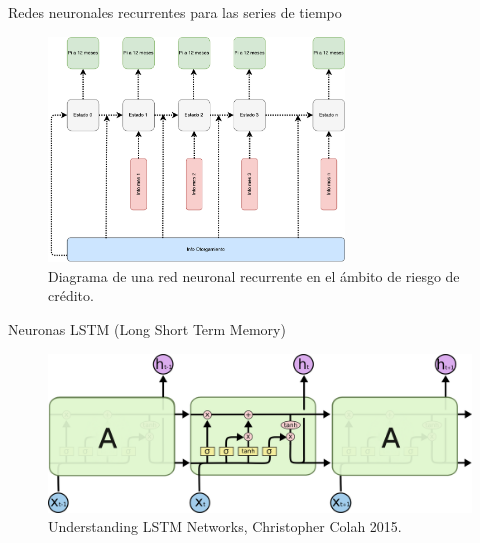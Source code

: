 \documentclass[11pt,usenames, dvipsnames]{beamer}
\begin{document}
\begin{frame}{Redes neuronales recurrentes para las series de tiempo}
    \begin{figure}
        \includegraphics[width=0.7\textwidth]{figures/SARC} 
        \caption{Diagrama de una red neuronal recurrente en el ámbito de riesgo de crédito.}
    \end{figure}
\end{frame}


\begin{frame}{Neuronas LSTM (Long Short Term Memory)}
    \begin{figure}
      \includegraphics[width=\textwidth]{figures/lstm}
      \caption{Understanding LSTM Networks, Christopher Colah 2015.}
    \end{figure}
\end{frame}
\end{document}
